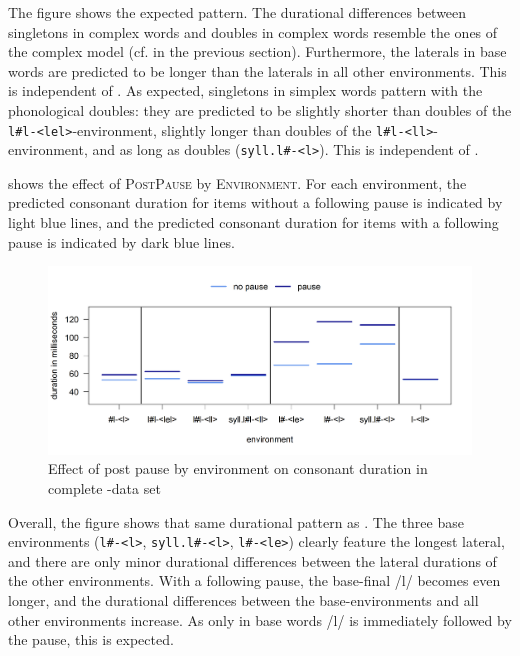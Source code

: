  The figure shows the expected pattern. The durational differences between singletons in complex words and doubles in complex words resemble the ones of the complex model (cf.  in the previous section). 
 Furthermore, the laterals in base words are predicted to be longer than the laterals in all other environments. This is independent of . 
 As expected, singletons in simplex words pattern with the phonological doubles: they are predicted to be slightly shorter than doubles of the \texttt{l\#l-<lel>}-environment, slightly longer than doubles of the \texttt{l\#l-<ll>}-environment, and as long as  doubles (\texttt{syll.l\#-<l>}). This is independent of .
 
 
 
  shows the effect of \textsc{PostPause} by \textsc{Environment}. For each environment, the predicted consonant duration for items without a following pause is indicated by light blue lines, and the predicted consonant duration for  items with a following pause is indicated by dark blue lines.

 \begin{figure}
 	

 	\includegraphics [scale=0.48] {images/Experiment/LyModelCompleteInterEnvPauseLines}

 	\caption{Effect of  post pause by environment on consonant duration in complete -data set}
 	\label{fig:Env pause lyComplete experiment}

 \end{figure}
 

 Overall, the figure shows that same durational pattern as . The three base environments (\texttt{l\#-<l>}, \texttt{syll.l\#-<l>}, \texttt{l\#-<le>}) clearly feature the longest lateral, and there are only minor durational differences between the lateral durations of the other environments. 
 With a following pause, the base-final /l/ becomes even longer, and the durational differences between the base-environments and all other environments increase. As only in base words /l/ is immediately followed by the pause, this is expected. 



